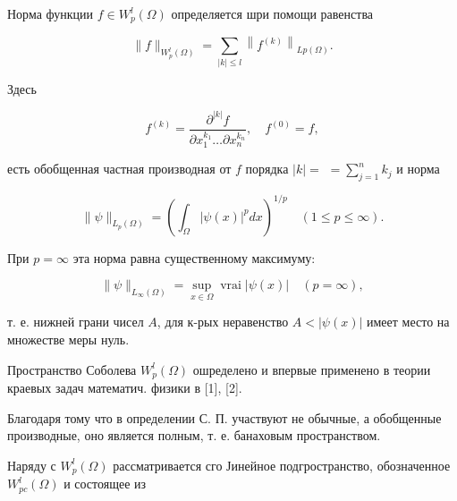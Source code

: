 \documentclass[10pt]{article}
\begin{document}
Норма функции $f \in W_{p}^{l}(\Omega)$ определяется шри помощи равенства



\[

\|f\|_{W_{p}^{l}(\Omega)}=\sum_{|k| \leqslant l}\left\|f^{(k)}\right\|_{L p(\Omega)} .

\]



Здесь



\[

f^{(k)}=\frac{\partial^{|k|} f}{\partial x_{1}^{k_{1}} \ldots \partial x_{n}^{k_{n}}}, \quad f^{(0)}=f,

\]



есть обобщенная частная производная от $f$ порядка $|k|=$ $=\sum_{j=1}^{n} k_{j}$ и норма



\[

\|\psi\|_{L_{p}(\Omega)}=\left(\int_{\Omega}|\psi(x)|^{p} d x\right)^{1 / p} \quad(1 \leqslant p \leqslant \infty) .

\]



При $p=\infty$ эта норма равна существенному максимуму:



\[

\|\psi\|_{L_{\infty}(\Omega)}=\sup _{x \in \Omega} \operatorname{vrai}|\psi(x)| \quad(p=\infty),

\]



т. е. нижней грани чисел $A$, для к-рых неравенство $A<|\psi(x)|$ имеет место на множестве меры нуль.



Пространство Соболева $W_{p}^{l}(\Omega)$ ошределено и впервые применено в теории краевых задач математич. физики в [1], [2].



Благодаря тому что в определении С. П. участвуют не обычные, а обобщенные производные, оно является полным, т. е. банаховым пространством.



Наряду с $W_{p}^{l}(\Omega)$ рассматривается сго Јинейное подгространство, обозначенное $W_{p c}^{l}(\Omega)$ и состоящее из
\end{document}
